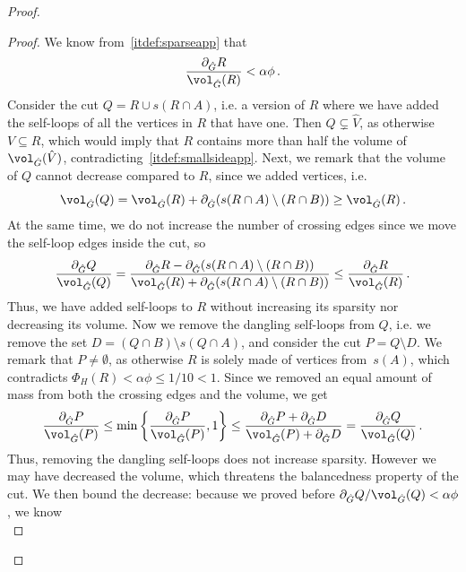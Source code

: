 \begin{proof}
\begin{proof}
	\noindent
	We know from~\eqref{itdef:sparseapp} that
	\begin{equation*}
		\frac{\partial_{\hat{G}} R}{\vol_{\hat{G}} (R)} < \alpha \phi \, .
	\end{equation*}
	Consider the cut $Q=R \cup s(R \cap A)$, i.e. a version of $R$ where we have added the self-loops of all the vertices in $R$ that have one. Then $Q \subsetneq \hat{V}$, as otherwise $V \subseteq R$, which would imply that $R$ contains more than half the volume of $\vol_{\hat{G}}(\hat{V})$, contradicting~\eqref{itdef:smallsideapp}. Next, we remark that the volume of $Q$ cannot decrease compared to $R$, since we added vertices, i.e.
	\begin{equation}
		\label{eq:volrq}
		\vol_{\hat{G}}(Q) = \vol_{\hat{G}}(R) + \partial_{\hat{G}}(s(R \cap A) \setminus (R \cap B)) \ge \vol_{\hat{G}}(R)\, .
	\end{equation}
	At the same time, we do not increase the number of crossing edges since we move the self-loop edges inside the cut, so
	\begin{equation*}
		\frac{\partial_{\hat{G}} Q}{\vol_{\hat{G}}(Q)} = \frac{\partial_{\hat{G}} R - \partial_{\hat{G}}(s(R \cap A) \setminus (R \cap B))}{\vol_{\hat{G}}(R) + \partial_{\hat{G}}(s(R \cap A) \setminus (R \cap B))} \le \frac{\partial_{\hat{G}} R}{\vol_{\hat{G}} (R)} \, .
	\end{equation*}
	Thus, we have added self-loops to $R$ without increasing its sparsity nor decreasing its volume. Now we remove the dangling self-loops from $Q$, i.e. we remove the set $D=(Q \cap B) \setminus s(Q \cap A)$, and consider the cut $P=Q \setminus D$. We remark that $P \neq \emptyset$, as otherwise $R$ is solely made of vertices from~$s(A)$, which contradicts $\Phi_H(R) < \alpha \phi \le 1/10 < 1$. Since we removed an equal amount of mass from both the crossing edges and the volume, we get
	\begin{equation*}
		\frac{\partial_{\hat{G}} P}{\vol_{\hat{G}}(P)} \le \min\left\{\frac{\partial_{\hat{G}} P}{\vol_{\hat{G}}(P)}, 1\right\} \le \frac{\partial_{\hat{G}} P + \partial_{\hat{G}} D}{\vol_{\hat{G}}(P)+\partial_{\hat{G}} D}  = \frac{\partial_{\hat{G}} Q}{\vol_{\hat{G}} (Q)} \, .
	\end{equation*}
	Thus, removing the dangling self-loops does not increase sparsity. However we may have decreased the volume, which threatens the balancedness property of the cut. We then bound the decrease: because we proved before ${\partial_{\hat{G}} Q}/{\vol_{\hat{G}} (Q)} < \alpha \phi$, we know
	\begin{equation*}

\end{equation*}
\end{proof}
\end{proof}
